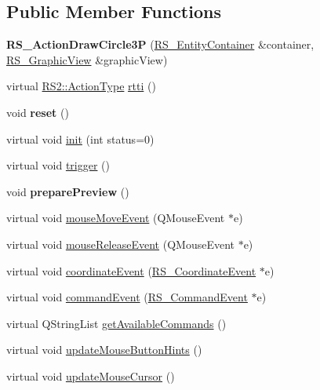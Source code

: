 \subsection*{Public Member Functions}
\begin{DoxyCompactItemize}
\item 
\hypertarget{classRS__ActionDrawCircle3P_a46f682b5fca74cd7d00bd9566d5d5652}{{\bfseries R\-S\-\_\-\-Action\-Draw\-Circle3\-P} (\hyperlink{classRS__EntityContainer}{R\-S\-\_\-\-Entity\-Container} \&container, \hyperlink{classRS__GraphicView}{R\-S\-\_\-\-Graphic\-View} \&graphic\-View)}\label{classRS__ActionDrawCircle3P_a46f682b5fca74cd7d00bd9566d5d5652}

\item 
virtual \hyperlink{classRS2_afe3523e0bc41fd637b892321cfc4b9d7}{R\-S2\-::\-Action\-Type} \hyperlink{classRS__ActionDrawCircle3P_a15467b6c463aa9f36d7d28f3acf9bf07}{rtti} ()
\item 
\hypertarget{classRS__ActionDrawCircle3P_a595399ea32b312b6adb63843cc2dee7a}{void {\bfseries reset} ()}\label{classRS__ActionDrawCircle3P_a595399ea32b312b6adb63843cc2dee7a}

\item 
virtual void \hyperlink{classRS__ActionDrawCircle3P_a4e7318669c35de4b4eadc2abe9f01f7e}{init} (int status=0)
\item 
virtual void \hyperlink{classRS__ActionDrawCircle3P_a5218ce6b698e770f5bc990221e10036b}{trigger} ()
\item 
\hypertarget{classRS__ActionDrawCircle3P_a6c5f2b785c0f40c52a9faf15b2fb51e7}{void {\bfseries prepare\-Preview} ()}\label{classRS__ActionDrawCircle3P_a6c5f2b785c0f40c52a9faf15b2fb51e7}

\item 
virtual void \hyperlink{classRS__ActionDrawCircle3P_aaaadedcc392df6947e13b037b37e3037}{mouse\-Move\-Event} (Q\-Mouse\-Event $\ast$e)
\item 
virtual void \hyperlink{classRS__ActionDrawCircle3P_a7b9f000d53fedb237a2d9528ff204648}{mouse\-Release\-Event} (Q\-Mouse\-Event $\ast$e)
\item 
virtual void \hyperlink{classRS__ActionDrawCircle3P_acb59d8d7b3b04a1b3ed83cc025a7fda6}{coordinate\-Event} (\hyperlink{classRS__CoordinateEvent}{R\-S\-\_\-\-Coordinate\-Event} $\ast$e)
\item 
virtual void \hyperlink{classRS__ActionDrawCircle3P_a3c5c10ecc7e22e32f38531f53f2f716c}{command\-Event} (\hyperlink{classRS__CommandEvent}{R\-S\-\_\-\-Command\-Event} $\ast$e)
\item 
virtual Q\-String\-List \hyperlink{classRS__ActionDrawCircle3P_ac0b73ba37280e8ccf1bdef8c80d53ec0}{get\-Available\-Commands} ()
\item 
virtual void \hyperlink{classRS__ActionDrawCircle3P_a4f1f396c93a0eac881d6c1314a20bf66}{update\-Mouse\-Button\-Hints} ()
\item 
virtual void \hyperlink{classRS__ActionDrawCircle3P_a9d0b8b3a86e59b8a88260f8a195dcb26}{update\-Mouse\-Cursor} ()
\end{DoxyCompactItemize}
